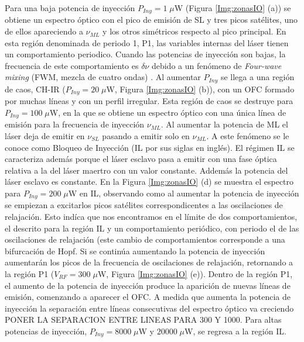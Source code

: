 		Para una baja potencia de inyección $P_{Iny} = 1 \; \mu$W (Figura \ref{Img:zonasIO} (a)) se obtiene un espectro óptico con el pico de emisión de SL y tres picos satélites, uno de ellos apareciendo a $\nu_{ML}$ y los otros simétricos respecto al pico principal. En esta región denominada de periodo 1, P1, las variables internas del láser tienen un comportamiento periodico. Cuando las potencias de inyección son bajas, la frecuencia de este comportamiento es $\delta\nu$ debido a un fenómeno de \textit{Four-wave mixing} (FWM, mezcla de cuatro ondas) \cite{van1995semiconductor}. Al aumentar $P_{Iny}$ se llega a una región de caos, CH-IR ($P_{Iny} = 20\; \mu$W, Figura \ref{Img:zonasIO} (b)), con un OFC formado por muchas líneas y con un perfil irregular. Esta región de caos se destruye para $P_{Iny} = 100\;\mu$W, en la que se obtiene un espectro óptico con una única línea de emisión para la frecuencia de inyección $\nu_{ML}$. Al aumentar la potencia de ML el láser deja de emitir en $\nu_{SL}$ pasando a emitir solo en $\nu_{ML}$. A este fenómeno se le conoce como Bloqueo de Inyección (IL por sus siglas en inglés). El régimen IL se caracteriza además porque el láser esclavo pasa a emitir con una fase óptica relativa a la del láser maertro con un valor constante. Addemás la potencia del láser esclavo es constante. En la Figura \ref{Img:zonasIO} (d) se muestra el espectro para $P_{Iny} = 200\;\mu$W en IL, observando como al aumentar la potencia de inyección se empiezan a excitarlos picos satélites correspondicentes a las oscilaciones de relajación. Esto indíca que nos encontramos en el límite de dos comportamientos, el descrito para la región IL y un comportamiento periódico, con periodo el de las oscilaciones de relajación (este cambio de comportamientos corresponde a una bifurcación de Hopf. Si se continúa aumentando la potencia de inyección aumentarán los picos de la frecuencia de oscilaciones de relajación, retornando a la región P1 ($V_{RF} = 300\;\mu$W, Figura \ref{Img:zonasIO} (e)). Dentro de la región P1, el aumento de la potencia de inyección produce la aparición de nuevas líneas de emisión, comenzando a aparecer el OFC. A medida que aumenta la potencia de inyección la separación entre líneas consecutivas del espectro óptico va creciendo  PONER LA SEPARACION ENTRE LINEAS PARA 300 Y 1000. Para altas potencias de inyección, $P_{Iny} = 8000 \;\mu$W y $20000 \;\mu$W, se regresa a la región IL.

